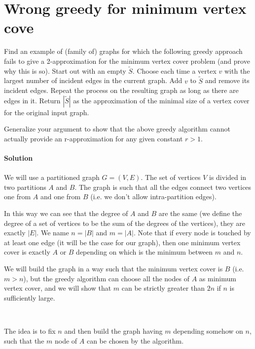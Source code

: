 \documentclass[a4paper]{article}
\begin{document}
\section*{Wrong greedy for minimum vertex cove}
Find an example of (family of) graphs for which the following greedy approach fails to give a 2-approximation for the minimum vertex cover problem (and prove why this is so). 
Start out with an empty $\tilde{S}$.
Choose each time a vertex $v$ with the largest number of incident edges in the current graph.
Add $v$ to $\tilde{S}$ and remove its incident edges.
Repeat the process on the resulting graph as long as there are edges in it.
Return $|\tilde{S}|$ as the approximation of the minimal size of a vertex cover for the original input graph.

Generalize your argument to show that the above greedy algorithm cannot actually provide an r-approximation for any given constant $r > 1$.
\\
\\
\textbf{Solution}
\\
\\
We will use a partitioned graph $G = (V, E)$.
The set of vertices $V$ is divided in two partitions $A$ and $B$.
The graph is such that all the edges connect two vertices one from $A$ and one from $B$ (i.e. we don't allow intra-partition edges).

In this way we can see that the degree of $A$ and $B$ are the same (we define the degree of a set of vertices to be the sum of the degrees of the vertices), they are exactly $|E|$.
We name $n = |B|$ and $m = |A|$.
Note that if every node is touched by at least one edge (it will be the case for our graph), then one minimum vertex cover is exactly $A$ or $B$ depending on which is the minimum between $m$ and $n$.

We will build the graph in a way such that the minimum vertex cover is $B$ (i.e. $m > n$), but the greedy algorithm can choose all the nodes of $A$ as minimum vertex cover, and we will show that $m$ can be strictly greater than $2n$ if $n$ is sufficiently large.

\

%
%
The idea is to fix $n$ and then build the graph having $m$ depending somehow on $n$, such that the $m$ node of $A$ can be chosen by the algorithm. 
\end{document}
